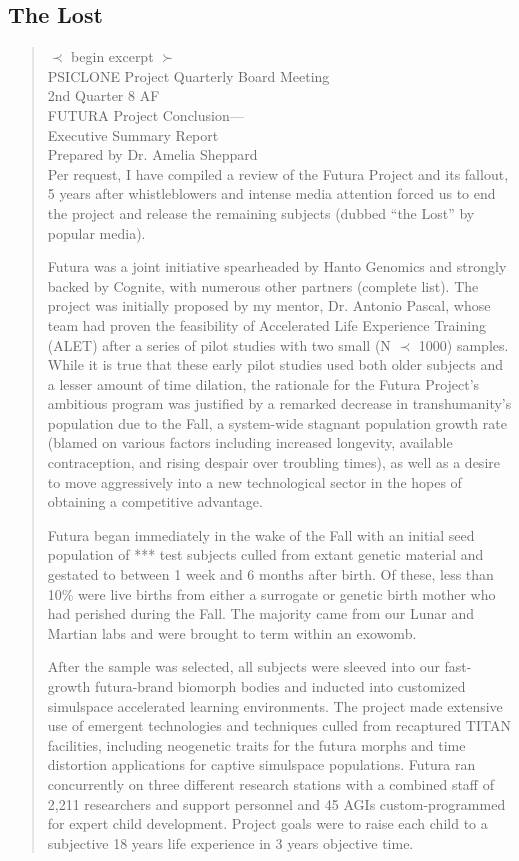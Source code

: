\subsection{The Lost}

\begin{quotation}
$\prec$ begin excerpt $\succ$ \\
PSICLONE Project Quarterly Board Meeting \\
2nd Quarter 8 AF \\
FUTURA Project Conclusion—  \\
Executive Summary Report \\
Prepared by Dr. Amelia Sheppard	
\\
Per request, I have compiled a review of the
Futura Project and its fallout, 5 years after
whistleblowers and intense media attention
forced us to end the project and release the
remaining subjects (dubbed “the Lost” by
popular media).

Futura was a joint initiative spearheaded by
Hanto Genomics and strongly backed by Cognite,
with numerous other partners (complete
list). The project was initially proposed by my
mentor, Dr. Antonio Pascal, whose team had
proven the feasibility of Accelerated Life Experience
Training (ALET) after a series of pilot
studies with two small (N $ \prec $ 1000) samples.
While it is true that these early pilot studies
used both older subjects and a lesser amount
of time dilation, the rationale for the Futura
Project’s ambitious program was justified by a
remarked decrease in transhumanity’s population
due to the Fall, a system-wide stagnant
population growth rate (blamed on various
factors including increased longevity, available
contraception, and rising despair over troubling
times), as well as a desire to move aggressively
into a new technological sector in the hopes of
obtaining a competitive advantage.

Futura began immediately in the wake
of the Fall with an initial seed population
of *** test subjects culled from extant genetic
material and gestated to between 1 week and
6 months after birth. Of these, less than 10\%
were live births from either a surrogate or
genetic birth mother who had perished during
the Fall. The majority came from our Lunar and
Martian labs and were brought to term within
an exowomb.

After the sample was selected, all subjects
were sleeved into our fast-growth futura-brand
biomorph bodies and inducted into customized
simulspace accelerated learning environments.
The project made extensive use of emergent
technologies and techniques culled from recaptured
TITAN facilities, including neogenetic
traits for the futura morphs and time distortion
applications for captive simulspace populations.
Futura ran concurrently on three different
research stations with a combined staff of
2,211 researchers and support personnel and
45 AGIs custom-programmed for expert child
development. Project goals were to raise each
child to a subjective 18 years life experience in
3 years objective time.


\end{quotation}
